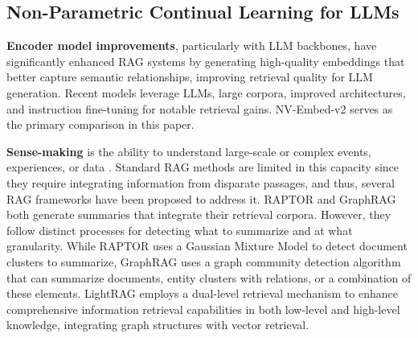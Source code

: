 \subsection{Non-Parametric Continual Learning for LLMs}

\textbf{Encoder model improvements}, particularly with LLM backbones, have significantly enhanced RAG systems by generating high-quality embeddings that better capture semantic relationships, improving retrieval quality for LLM generation. Recent models \cite{gte,gritlm,nvembedv2} leverage LLMs, large corpora, improved architectures, and instruction fine-tuning for notable retrieval gains. NV-Embed-v2 \cite{nvembedv2} serves as the primary comparison in this paper.

\noindent \textbf{Sense-making} is the ability to understand large-scale 
or complex events, experiences, or data \cite{koli-etal-2024-sensemaking}. Standard RAG methods are limited in this capacity since they require integrating information from disparate passages, and thus, several RAG frameworks have been proposed to address it. RAPTOR \cite{raptor} and GraphRAG \cite{graphrag} both generate summaries that integrate their retrieval corpora. However, they follow distinct processes for detecting what to summarize and at what granularity. While RAPTOR uses a Gaussian Mixture Model to detect document clusters to summarize, GraphRAG uses a graph community detection algorithm that can summarize documents, entity clusters with relations, or a combination of these elements.
LightRAG \cite{lightrag} employs a dual-level retrieval mechanism to enhance comprehensive information retrieval capabilities in both low-level and high-level knowledge, integrating graph structures with vector retrieval. 

